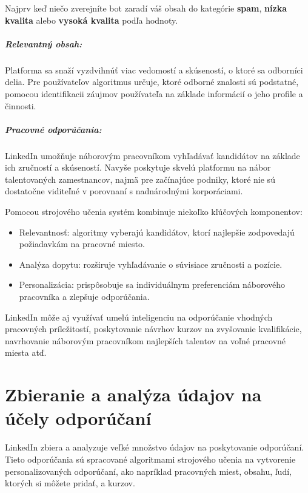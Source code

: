\documentclass[twoside,slovak,a4paper]{coursepaper}
\begin{document}
Najprv keď niečo zverejníte bot zaradí váš obsah do kategórie \textbf{spam}, \textbf{nízka kvalita} alebo \textbf{vysoká kvalita} podľa hodnoty. ~\cite{Terez:article}

\subparagraph{Relevantný obsah:}Platforma sa snaží vyzdvihnúť viac vedomostí a skúseností, o ktoré sa odborníci delia. Pre používateľov algoritmus určuje, ktoré odborné znalosti sú podstatné, pomocou identifikacii záujmov používateľa na základe informácií o jeho profile a činnosti.~\cite{Barnhart:article}

\subparagraph{Pracovné odporúčania:}
LinkedIn umožňuje náborovým pracovníkom vyhľadávať kandidátov na základe ich zručností a skúseností. Navyše poskytuje skvelú platformu na nábor talentovaných zamestnancov, najmä pre začínajúce podniky, ktoré nie sú dostatočne viditeľné v porovnaní s nadnárodnými korporáciami.~\cite{Rodriguez:article}

Pomocou strojového učenia systém kombinuje niekoľko kľúčových komponentov:
\begin{itemize}
	\item Relevantnosť: algoritmy vyberajú kandidátov, ktorí najlepšie zodpovedajú požiadavkám na pracovné miesto.
	\item Analýza dopytu: rozširuje vyhľadávanie o súvisiace zručnosti a pozície.
	\item Personalizácia: prispôsobuje sa individuálnym preferenciám náborového pracovníka a zlepšuje odporúčania.
  \end{itemize}

LinkedIn môže aj využívať umelú inteligenciu na odporúčanie vhodných pracovných príležitostí, poskytovanie návrhov kurzov na zvyšovanie kvalifikácie, navrhovanie náborovým pracovníkom najlepších talentov na voľné pracovné miesta atď.~\cite{Mangla:article}


\section{Zbieranie a analýza údajov na účely odporúčaní} \label{analýza údajov}
LinkedIn zbiera a analyzuje veľké množstvo údajov na poskytovanie odporúčaní. Tieto odporúčania sú spracované algoritmami strojového učenia na vytvorenie personalizovaných odporúčaní, ako napríklad pracovných miest, obsahu, ľudí, ktorých si môžete pridať, a kurzov.
\end{document}
